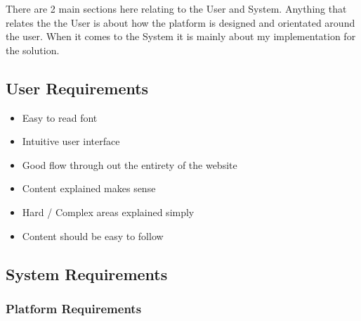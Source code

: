 There are 2 main sections here relating to the User and System. Anything that relates the the User is about how the platform is designed and orientated around the user. When it comes to the System it is mainly about my implementation for the solution.

\subsection{User Requirements}

\begin{itemize}
\item{Easy to read font}
\item{Intuitive user interface}
\item{Good flow through out the entirety of the website}
\item{Content explained makes sense}
\item{Hard / Complex areas explained simply}
\item{Content should be easy to follow}
\end{itemize}

\subsection{System Requirements}
\subsubsection{Platform Requirements}


